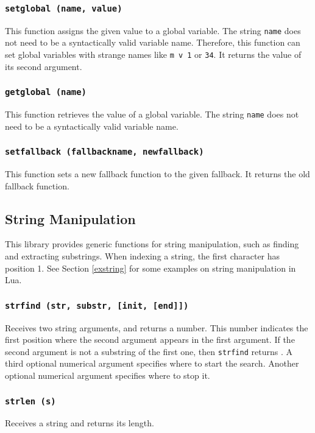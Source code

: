 \subsubsection*{{\tt setglobal (name, value)}}
This function assigns the given value to a global variable.
The string \verb'name' does not need to be a syntactically valid variable name.
Therefore, this function can set global variables with strange names like
\verb'm v 1' or \verb'34'.
It returns the value of its second argument.

\subsubsection*{{\tt getglobal (name)}}
This function retrieves the value of a global variable.
The string \verb'name' does not need to be a syntactically valid variable name.

\subsubsection*{{\tt setfallback (fallbackname, newfallback)}}
This function sets a new fallback function to the given fallback.
It returns the old fallback function.

\subsection{String Manipulation}
This library provides generic functions for string manipulation,
such as finding and extracting substrings.
When indexing a string, the first character has position 1.
See Section \ref{exstring} for some examples on string manipulation
in Lua.

\subsubsection*{{\tt strfind (str, substr, [init, [end]])}}
Receives two string arguments,
and returns a number.
This number indicates the first position where the second argument appears
in the first argument.
If the second argument is not a substring of the first one,
then \verb'strfind' returns \nil.
A third optional numerical argument specifies where to start the search.
Another optional numerical argument specifies where to stop it.

\subsubsection*{{\tt strlen (s)}}
Receives a string and returns its length.

